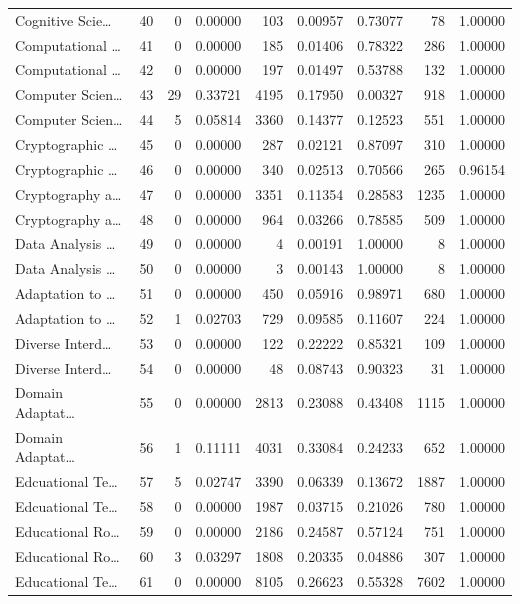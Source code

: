 \begin{table}
\begin{tabular}{lrrrrrrrr}
Cognitive Scie… & 40 & 0 & 0.00000 & 103 & 0.00957 & 0.73077 & 78 & 1.00000 \\
Computational … & 41 & 0 & 0.00000 & 185 & 0.01406 & 0.78322 & 286 & 1.00000 \\
Computational … & 42 & 0 & 0.00000 & 197 & 0.01497 & 0.53788 & 132 & 1.00000 \\
Computer Scien… & 43 & 29 & 0.33721 & 4195 & 0.17950 & 0.00327 & 918 & 1.00000 \\
Computer Scien… & 44 & 5 & 0.05814 & 3360 & 0.14377 & 0.12523 & 551 & 1.00000 \\
Cryptographic … & 45 & 0 & 0.00000 & 287 & 0.02121 & 0.87097 & 310 & 1.00000 \\
Cryptographic … & 46 & 0 & 0.00000 & 340 & 0.02513 & 0.70566 & 265 & 0.96154 \\
Cryptography a… & 47 & 0 & 0.00000 & 3351 & 0.11354 & 0.28583 & 1235 & 1.00000 \\
Cryptography a… & 48 & 0 & 0.00000 & 964 & 0.03266 & 0.78585 & 509 & 1.00000 \\
Data Analysis … & 49 & 0 & 0.00000 & 4 & 0.00191 & 1.00000 & 8 & 1.00000 \\
Data Analysis … & 50 & 0 & 0.00000 & 3 & 0.00143 & 1.00000 & 8 & 1.00000 \\
Adaptation to … & 51 & 0 & 0.00000 & 450 & 0.05916 & 0.98971 & 680 & 1.00000 \\
Adaptation to … & 52 & 1 & 0.02703 & 729 & 0.09585 & 0.11607 & 224 & 1.00000 \\
Diverse Interd… & 53 & 0 & 0.00000 & 122 & 0.22222 & 0.85321 & 109 & 1.00000 \\
Diverse Interd… & 54 & 0 & 0.00000 & 48 & 0.08743 & 0.90323 & 31 & 1.00000 \\
Domain Adaptat… & 55 & 0 & 0.00000 & 2813 & 0.23088 & 0.43408 & 1115 & 1.00000 \\
Domain Adaptat… & 56 & 1 & 0.11111 & 4031 & 0.33084 & 0.24233 & 652 & 1.00000 \\
Edcuational Te… & 57 & 5 & 0.02747 & 3390 & 0.06339 & 0.13672 & 1887 & 1.00000 \\
Edcuational Te… & 58 & 0 & 0.00000 & 1987 & 0.03715 & 0.21026 & 780 & 1.00000 \\
Educational Ro… & 59 & 0 & 0.00000 & 2186 & 0.24587 & 0.57124 & 751 & 1.00000 \\
Educational Ro… & 60 & 3 & 0.03297 & 1808 & 0.20335 & 0.04886 & 307 & 1.00000 \\
Educational Te… & 61 & 0 & 0.00000 & 8105 & 0.26623 & 0.55328 & 7602 & 1.00000 \\

\end{tabular}
\end{table}
